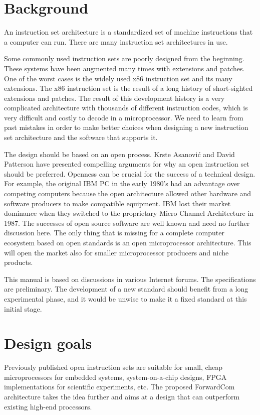 \documentclass[forwardcom.tex]{subfiles}
\begin{document}
\section{Background}
An instruction set architecture is a standardized set of machine instructions that a computer can run. There are many instruction set architectures in use.
\vspace{2mm}

Some commonly used instruction sets are poorly designed from the beginning. These systems have been augmented many times with extensions and patches. One of the worst cases is the widely used x86 instruction set and its many extensions. The x86 instruction set is the result of a long history of short-sighted extensions and patches. The result of this development history is a very complicated architecture with thousands of different instruction codes, which is very difficult and costly to decode in a microprocessor. We need to learn from past mistakes in order to make better choices when designing a new instruction set architecture and the software that supports it.
\vspace{2mm}

The design should be based on an open process. Krste Asanović and David Patterson have presented compelling arguments for why an open instruction set should be preferred. Openness can be crucial for the success of a technical design. For example, the original IBM PC in the early 1980's had an advantage over competing computers because the open architecture allowed other hardware and software producers to make compatible equipment. IBM lost their market dominance when they switched to the proprietary Micro Channel Architecture in 1987. The successes of open source software are well known and need no further discussion here. The only thing that is missing for a complete computer ecosystem based on open standards is an open microprocessor architecture. This will open the market also for smaller microprocessor producers and niche products.
\vspace{2mm}

This manual is based on discussions in various Internet forums. The specifications are preliminary. The development of a new standard should benefit from a long experimental phase, and it would be unwise to make it a fixed standard at this initial stage.


\section{Design goals}
Previously published open instruction sets are suitable for small, cheap microprocessors for embedded systems, system-on-a-chip designs, FPGA implementations for scientific experiments, etc. The proposed ForwardCom architecture takes the idea further and aims at a design that can outperform existing high-end processors.
\vspace{2mm}
\end{document}
